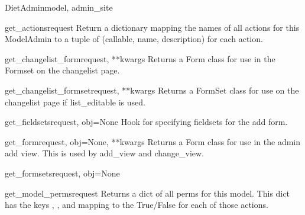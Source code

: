 \documentclass[letterpaper,10pt,english]{sphinxmanual}
\begin{document}
\begin{classdesc}{DietAdmin}{model, admin\_site}
\hypertarget{data.admin.DietAdmin.get_actions}{}\begin{methoddesc}{get\_actions}{request}
Return a dictionary mapping the names of all actions for this
ModelAdmin to a tuple of (callable, name, description) for each action.
\end{methoddesc}

\hypertarget{data.admin.DietAdmin.get_changelist_form}{}\begin{methoddesc}{get\_changelist\_form}{request, **kwargs}
Returns a Form class for use in the Formset on the changelist page.
\end{methoddesc}

\hypertarget{data.admin.DietAdmin.get_changelist_formset}{}\begin{methoddesc}{get\_changelist\_formset}{request, **kwargs}
Returns a FormSet class for use on the changelist page if list\_editable
is used.
\end{methoddesc}

\hypertarget{data.admin.DietAdmin.get_fieldsets}{}\begin{methoddesc}{get\_fieldsets}{request, obj=None}
Hook for specifying fieldsets for the add form.
\end{methoddesc}

\hypertarget{data.admin.DietAdmin.get_form}{}\begin{methoddesc}{get\_form}{request, obj=None, **kwargs}
Returns a Form class for use in the admin add view. This is used by
add\_view and change\_view.
\end{methoddesc}

\hypertarget{data.admin.DietAdmin.get_formsets}{}\begin{methoddesc}{get\_formsets}{request, obj=None}\end{methoddesc}

\hypertarget{data.admin.DietAdmin.get_model_perms}{}\begin{methoddesc}{get\_model\_perms}{request}
Returns a dict of all perms for this model. This dict has the keys
, , and  mapping to the True/False for each
of those actions.
\end{methoddesc}


\end{classdesc}
\end{document}
